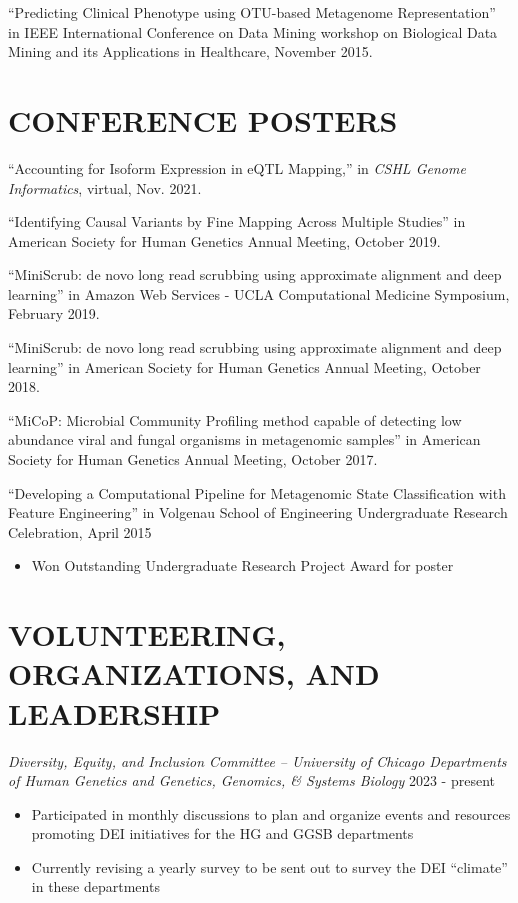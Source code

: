\documentclass[margin, 10pt]{res} %
\begin{document}
\begin{resume}
``Predicting Clinical Phenotype using OTU-based Metagenome Representation'' in IEEE International Conference on Data Mining workshop on Biological Data Mining and its Applications in Healthcare, November 2015.


\section{CONFERENCE POSTERS}

``Accounting for Isoform Expression in eQTL Mapping,'' in {\sl CSHL Genome Informatics}, virtual, Nov. 2021.

``Identifying Causal Variants by Fine Mapping Across Multiple Studies'' in American Society for Human Genetics Annual Meeting, October 2019. 

``MiniScrub: de novo long read scrubbing using approximate alignment and deep learning'' in Amazon Web Services - UCLA Computational Medicine Symposium, February 2019.

``MiniScrub: de novo long read scrubbing using approximate alignment and deep learning'' in American Society for Human Genetics Annual Meeting, October 2018.

``MiCoP: Microbial Community Profiling method capable of detecting low abundance viral and fungal organisms in metagenomic samples'' in American Society for Human Genetics Annual Meeting, October 2017.

``Developing a Computational Pipeline for Metagenomic State Classification with Feature Engineering'' in Volgenau School of Engineering Undergraduate Research Celebration, April 2015
\begin{itemize} \itemsep -2pt %
\item Won Outstanding Undergraduate Research Project Award for poster
\end{itemize}



\section{VOLUNTEERING, ORGANIZATIONS, AND LEADERSHIP}
{\sl Diversity, Equity, and Inclusion Committee -- University of Chicago Departments of Human Genetics and Genetics, Genomics, \& Systems Biology} \hfill 2023 - present
\begin{itemize} \itemsep -2pt %
\item Participated in monthly discussions to plan and organize events and resources promoting DEI initiatives for the HG and GGSB departments
\item Currently revising a yearly survey to be sent out to survey the DEI ``climate'' in these departments
\end{itemize}


\end{resume}
\end{document}
